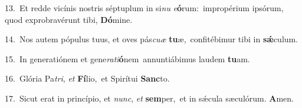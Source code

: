 {\numbfont\textcolor{\numbcolor}{13.}}~Et redde vicínis nostris séptuplum in si\textit{nu} \textit{e}\-\textbf{ó}rum:~\star impropérium ipsórum, quod exprobravérunt tibi, \textbf{Dó}\-mine.\par
{\numbfont\textcolor{\numbcolor}{14.}}~Nos autem pópulus tuus, et oves pás\-\textit{cu}\-\textit{æ} \textbf{tu}\-æ,~\star confitébimur tibi in \textbf{sǽ}\-culum.\par
{\numbfont\textcolor{\numbcolor}{15.}}~In generatiónem et gene\-\textit{ra}\-\textit{ti}\textbf{ó}nem~\star annuntiábimus laudem \textbf{tu}\-am.\par
{\numbfont\textcolor{\numbcolor}{16.}}~Glória Pa\-\textit{tri}\-, \textit{et} \textbf{Fí}\-lio,~\star et Spirítui \textbf{Sanc}\-to.\par
{\numbfont\textcolor{\numbcolor}{17.}}~Sicut erat in princípio, et \textit{nunc}\-, \textit{et} \textbf{sem}\-per,~\star et in sǽcula sæculórum. \textbf{A}\-men.\par
